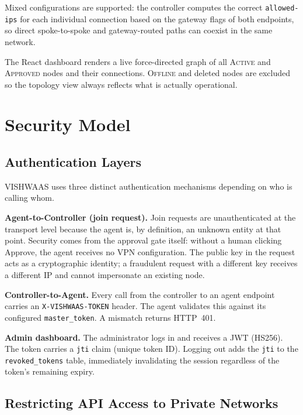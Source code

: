 \documentclass[conference]{IEEEtran}
\begin{document}
Mixed configurations are supported: the controller computes the correct
\texttt{allowed-ips} for each individual connection based on the gateway
flags of both endpoints, so direct spoke-to-spoke and gateway-routed paths
can coexist in the same network.

The React dashboard renders a live force-directed graph of all
\textsc{Active} and \textsc{Approved} nodes and their connections.
\textsc{Offline} and deleted nodes are excluded so the topology view always
reflects what is actually operational.


\section{Security Model}
\label{sec:security}

\subsection{Authentication Layers}

VISHWAAS uses three distinct authentication mechanisms depending on who is
calling whom.

\textbf{Agent-to-Controller (join request).} Join requests are unauthenticated
at the transport level because the agent is, by definition, an unknown entity
at that point. Security comes from the approval gate itself: without a human
clicking Approve, the agent receives no VPN configuration. The public key in
the request acts as a cryptographic identity; a fraudulent request with a
different key receives a different IP and cannot impersonate an existing node.

\textbf{Controller-to-Agent.} Every call from the controller to an agent
endpoint carries an \texttt{X-VISHWAAS-TOKEN} header. The agent validates
this against its configured \texttt{master\_token}. A mismatch returns
HTTP~401.

\textbf{Admin dashboard.} The administrator logs in and receives a JWT
(HS256). The token carries a \texttt{jti} claim (unique token ID). Logging
out adds the \texttt{jti} to the \texttt{revoked\_tokens} table, immediately
invalidating the session regardless of the token's remaining expiry.

\subsection{Restricting API Access to Private Networks}
\end{document}
